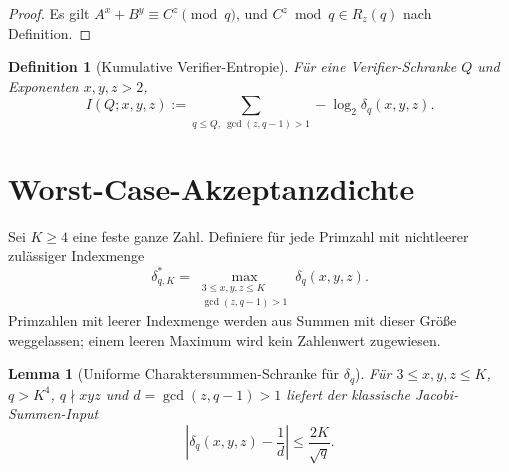 \documentclass[11pt,a4paper]{article}
\newtheorem{lemma}[theorem]{Lemma}
\newtheorem{definition}[theorem]{Definition}
\begin{document}
\begin{proof}
Es gilt $A^x+B^y \equiv C^z \pmod q$, und $C^z \bmod q \in R_z(q)$ nach Definition.
\end{proof}

\begin{definition}[Kumulative Verifier-Entropie]
\label{def:Iverifier}
Für eine Verifier-Schranke $Q$ und Exponenten $x,y,z>2$,
\[
  I(Q;x,y,z) := \sum_{q \le Q,\ \gcd(z,q-1)>1} -\log_2 \delta_q(x,y,z).
\]
\end{definition}

\section{Worst-Case-Akzeptanzdichte}

Sei $K\ge4$ eine feste ganze Zahl. Definiere für jede Primzahl mit
nichtleerer zulässiger Indexmenge
\[
 \delta_{q,K}^{*}=\max_{\substack{3\le x,y,z\le K\\
                         \gcd(z,q-1)>1}}\delta_q(x,y,z).
\]
Primzahlen mit leerer Indexmenge werden aus Summen mit dieser Größe
weggelassen; einem leeren Maximum wird kein Zahlenwert zugewiesen.

\begin{lemma}[Uniforme Charaktersummen-Schranke für $\delta_q$]
\label{lem:weil}
Für $3\le x,y,z\le K$, $q>K^4$, $q\nmid xyz$ und
$d=\gcd(z,q-1)>1$ liefert der klassische Jacobi-Summen-Input
\[
 \left|\delta_q(x,y,z)-\frac1d\right|\le\frac{2K}{\sqrt q}.
\]
\end{lemma}
\end{document}
